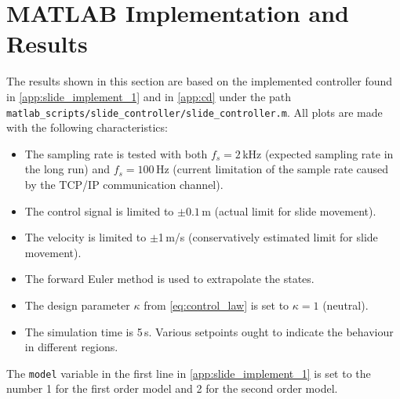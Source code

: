 \vspace{-0.3cm}
\section{MATLAB Implementation and Results}\label{sec:matlab-results-slide-safety}
\vspace{-0.2cm}
The results shown in this section are based on the implemented controller found in \autoref{app:slide_implement_1} and in \autoref{app:cd} under the path \texttt{matlab\_scripts/slide\_controller/slide\_controller.m}. All plots are made with the following characteristics:
\vspace{-1mm}
\begin{itemize}
	\itemsep-0.7mm
\item The sampling rate is tested with both $f_s = 2\,$kHz (expected sampling rate in the long run) and $f_s = 100\,$Hz (current limitation of the sample rate caused by the TCP/IP communication channel).
\item The control signal is limited to $\pm 0.1$\,m (actual limit for slide movement).
\item The velocity is limited to $\pm$1\,m/s (conservatively estimated limit for slide movement).
\item The forward Euler method is used to extrapolate the states.
\item The design parameter $\kappa$ from \autoref{eq:control_law} is set to $\kappa=1$ (neutral).
\item The simulation time is 5\,s. Various setpoints ought to indicate the behaviour in different regions.
\end{itemize}
The \texttt{model} variable in the first line in \autoref{app:slide_implement_1} is set to the number 1 for the first order model and 2 for the second order model. 


